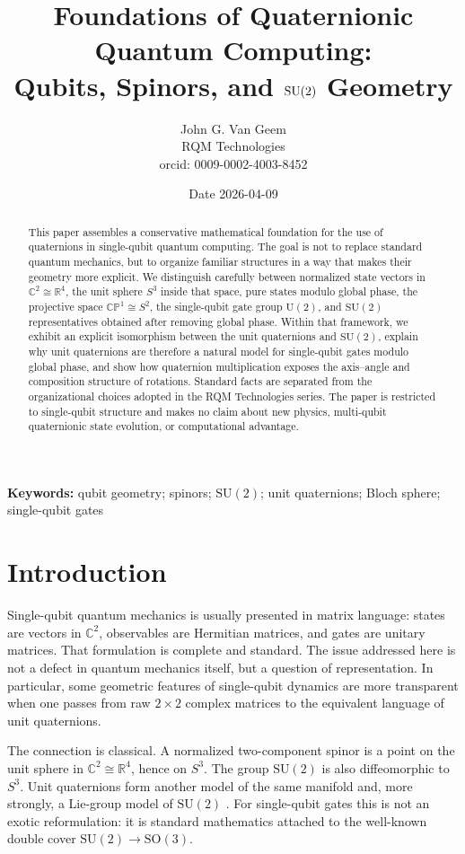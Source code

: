 \documentclass[11pt]{article}
\title{\textbf{Foundations of Quaternionic Quantum Computing:}\\
Qubits, Spinors, and $\SU(2)$ Geometry}
\author{John G. Van Geem\\
RQM Technologies\\
orcid: 0009-0002-4003-8452}
\date{Date 2026-04-09}
\theoremstyle{remark}
\newcommand{\R}{\mathbb{R}}
\newcommand{\C}{\mathbb{C}}
\newcommand{\CP}{\mathbb{CP}}
\newcommand{\SU}{\mathrm{SU}}
\newcommand{\U}{\mathrm{U}}
\newcommand{\SO}{\mathrm{SO}}
\begin{document}
\maketitle

\begin{abstract}
This paper assembles a conservative mathematical foundation for the use of quaternions in single-qubit quantum computing. The goal is not to replace standard quantum mechanics, but to organize familiar structures in a way that makes their geometry more explicit. We distinguish carefully between normalized state vectors in $\C^2 \cong \R^4$, the unit sphere $S^3$ inside that space, pure states modulo global phase, the projective space $\CP^1 \cong S^2$, the single-qubit gate group $\U(2)$, and $\SU(2)$ representatives obtained after removing global phase. Within that framework, we exhibit an explicit isomorphism between the unit quaternions and $\SU(2)$, explain why unit quaternions are therefore a natural model for single-qubit gates modulo global phase, and show how quaternion multiplication exposes the axis--angle and composition structure of rotations. Standard facts are separated from the organizational choices adopted in the RQM Technologies series. The paper is restricted to single-qubit structure and makes no claim about new physics, multi-qubit quaternionic state evolution, or computational advantage.
\end{abstract}

\noindent\textbf{Keywords:} qubit geometry; spinors; $\SU(2)$; unit quaternions; Bloch sphere; single-qubit gates

\section{Introduction}

Single-qubit quantum mechanics is usually presented in matrix language: states are vectors in $\C^2$, observables are Hermitian matrices, and gates are unitary matrices. That formulation is complete and standard. The issue addressed here is not a defect in quantum mechanics itself, but a question of representation. In particular, some geometric features of single-qubit dynamics are more transparent when one passes from raw $2 \times 2$ complex matrices to the equivalent language of unit quaternions.

The connection is classical. A normalized two-component spinor is a point on the unit sphere in $\C^2 \cong \R^4$, hence on $S^3$. The group $\SU(2)$ is also diffeomorphic to $S^3$. Unit quaternions form another model of the same manifold and, more strongly, a Lie-group model of $\SU(2)$ \citep{hall2015,kuipers1999,penrose1984}. For single-qubit gates this is not an exotic reformulation: it is standard mathematics attached to the well-known double cover $\SU(2)\to\SO(3)$.
\end{document}
